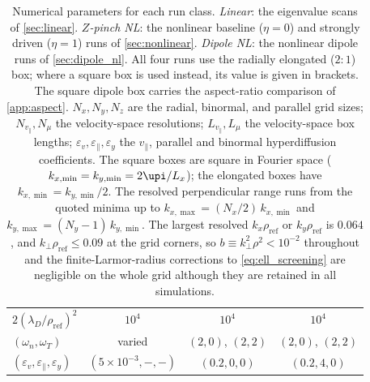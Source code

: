 \documentclass{jpp}
\newcommand{\kperp}{k_\perp}
\newcommand{\vpar}{v_\parallel}
\newcommand{\lambdaD}{\lambda_D}
\begin{document}
\begin{table}
\begin{tabular}{lccc}
$2(\lambdaD/\rho_\mathrm{ref})^2$              & $10^4$      & $10^4$          & $10^4$        \\
$(\omega_n, \omega_T)$                         & varied      & $(2, 0)$, $(2, 2)$ & $(2, 0)$, $(2, 2)$ \\
$(\varepsilon_v, \varepsilon_\parallel, \varepsilon_y)$ & $(5\!\times\!10^{-3}, -, -)$ & $(0.2, 0, 0)$ & $(0.2, 4, 0)$ \\
\hline
\end{tabular}
\caption{Numerical parameters for each run class. \textit{Linear}: the
eigenvalue scans of \cref{sec:linear}. \textit{$Z$-pinch NL}: the nonlinear
baseline ($\eta = 0$) and strongly driven ($\eta = 1$) runs of
\cref{sec:nonlinear}. \textit{Dipole NL}: the nonlinear dipole runs of
\cref{sec:dipole_nl}. All four runs use the radially elongated
($2\!:\!1$) box; where a square box is used instead, its value is given in
brackets. The square dipole box carries the aspect-ratio
comparison of \cref{app:aspect}. $N_x, N_y, N_z$ are
the radial, binormal, and parallel grid sizes; $N_{\vpar}, N_\mu$
the velocity-space resolutions; $L_{\vpar}, L_\mu$ the velocity-space
box lengths; $\varepsilon_v, \varepsilon_\parallel,
\varepsilon_y$ the $\vpar$, parallel and binormal
hyperdiffusion coefficients. The square boxes are square in Fourier
space ($k_{x,\min} = k_{y,\min} = 2\upi/L_x$); the elongated boxes have
$k_{x,\min} = k_{y,\min}/2$. The resolved perpendicular
range runs from the quoted minima up to $k_{x,\max} = (N_x/2)\,k_{x,\min}$
and $k_{y,\max} = (N_y-1)\,k_{y,\min}$. The largest resolved
$k_x\rho_\mathrm{ref}$ or $k_y\rho_\mathrm{ref}$ is $0.064$, and
$\kperp\rho_\mathrm{ref} \leq 0.09$ at the grid corners, so $b \equiv \kperp^2\rho^2 <
10^{-2}$ throughout and the finite-Larmor-radius corrections to
\cref{eq:ell_screening} are negligible on the whole grid although they are retained in all simulations.}
\label{tab:setup}
\end{table}
\end{document}
